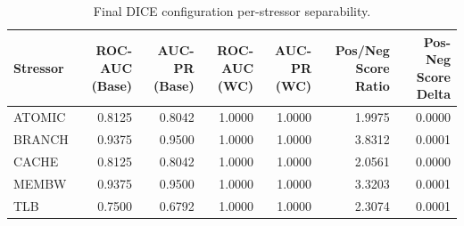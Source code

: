 \begin{table}[t]
\centering
\caption{Final DICE configuration per-stressor separability.}
\label{tab:dice_full_stressor}
\footnotesize
\begin{tabular}{lrrrrrr}
\toprule
Stressor & ROC-AUC (Base) & AUC-PR (Base) & ROC-AUC (WC) & AUC-PR (WC) & Pos/Neg Score Ratio & Pos-Neg Score Delta \\
\midrule
ATOMIC & 0.8125 & 0.8042 & 1.0000 & 1.0000 & 1.9975 & 0.0000 \\
BRANCH & 0.9375 & 0.9500 & 1.0000 & 1.0000 & 3.8312 & 0.0001 \\
CACHE & 0.8125 & 0.8042 & 1.0000 & 1.0000 & 2.0561 & 0.0000 \\
MEMBW & 0.9375 & 0.9500 & 1.0000 & 1.0000 & 3.3203 & 0.0001 \\
TLB & 0.7500 & 0.6792 & 1.0000 & 1.0000 & 2.3074 & 0.0001 \\
\bottomrule
\end{tabular}

\end{table}
